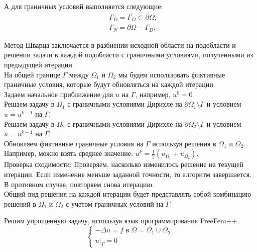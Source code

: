 \documentclass[a4paper, 12pt]{article}%
\begin{document}
	А для граничных условий выполняется следующие:
	$$
	\begin{aligned}
		& \Gamma_D=\overline{\Gamma_D} \subset \partial \Omega, \\
		& \Gamma_N=\partial \Omega-\Gamma_D ;
	\end{aligned}
	$$

	Метод Шварца заключается в разбиении исходной области на подобласти и решении задачи в каждой подобласти с граничными условиями, полученными из предыдущей итерации.\\
	
	На общей границе $\Gamma$ между $\Omega_1$ и $\Omega_2$ мы будем использовать фиктивные граничные условия, которые будут обновляться на каждой итерации.\\
	
	Задаем начальное приближение для $u$ на $\Gamma$, например, $u^0 = 0$\\
	
	Решаем задачу в $\Omega_1$ с граничными условиями Дирихле на $\partial \Omega_1 \setminus \Gamma$ и условием $u = u^{k-1}$ на $\Gamma$.\\
	Решаем задачу в $\Omega_2$ с граничными условиями Дирихле на $\partial \Omega_2 \setminus \Gamma$ и условием $u = u^{k-1}$ на $\Gamma$.\\
	
	Обновляем фиктивные граничные условия на $\Gamma$ используя решения в $\Omega_1$ и $\Omega_2$. Например, можно взять среднее значение: $u^k = \frac{1}{2} (u_{\Omega_1} + u_{\Omega_2})$.\\
	
	Проверка сходимости: Проверяем, насколько изменилось решение на текущей итерации. Если изменение меньше заданной точности, то алгоритм завершается. В противном случае, повторяем снова итерацию.\\
	
	Общий вид решения на каждой итерации будет представлять собой комбинацию решений в $\Omega_1$ и $\Omega_2$ с учетом граничных условий на $\Gamma$.\\
	
	\newpage
	
	Решим упрощенную задачу, используя язык программирования FreeFem++.
	$$
	\begin{cases}
		-\Delta u = f \text{ в } \Omega = \Omega_1 \cup \Omega_2\ \\
		u|_{\Gamma} = 0
	\end{cases}
	$$
	
\end{document}

